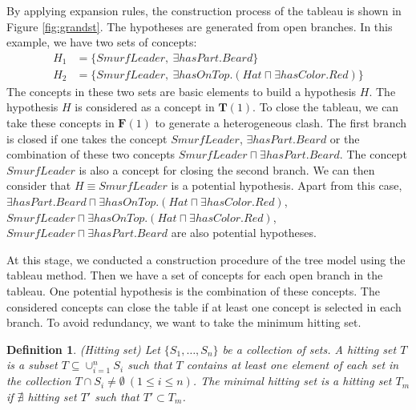 \documentclass{article}
\newtheorem{mydef}{Definition}
\begin{document}
By applying expansion rules, the construction process of the tableau is shown in Figure \ref{fig:grandst}. The hypotheses are generated from open branches.
In this example, we have two sets of concepts:
\begin{align*}
H_1&=\{SmurfLeader,~\exists hasPart.Beard\}\\
H_2&=\{SmurfLeader,~\exists hasOnTop.(Hat \sqcap  \exists hasColor.Red)\}
\end{align*}
The concepts in these two sets are basic elements to build a hypothesis $H$. The hypothesis $H$ is considered as a concept in $\mathbf{T}(1)$.
To close the tableau, we can take these concepts in $\mathbf{F}(1)$ to generate a heterogeneous clash.
The first branch is closed if one takes the concept $SmurfLeader$, $\exists hasPart.Beard$ or the combination of these two concepts
$SmurfLeader \sqcap \exists hasPart.Beard$. The concept $SmurfLeader$ is also a concept for closing the second branch. We can then consider that $H\equiv SmurfLeader$
is a potential hypothesis. Apart from this case, $\exists hasPart. Beard \sqcap \exists hasOnTop.(Hat \sqcap \exists hasColor.Red)$,
$SmurfLeader \sqcap \exists hasOnTop.(Hat \sqcap \exists hasColor.Red)$, $SmurfLeader \sqcap \exists hasPart.Beard$ are also potential hypotheses.

At this stage, we conducted a construction procedure of the tree model using  the tableau method. Then we have a set of concepts for each open branch in the tableau.
One potential hypothesis is the combination of these concepts. The considered concepts can close the table if at least one concept is selected in each branch.
To avoid redundancy, we want to take the minimum hitting set. 
\begin{mydef}{(Hitting set)}
 Let $\{ S_1,\dots,S_n\}$ be a collection of sets. A hitting set  $T$ is a subset $T\subseteq \cup_{i=1}^{n} S_i$ such that $T$ contains at least one element
 of each set in the collection $T \cap S_i \neq \emptyset~(1\leq i\leq n)$.
 The minimal hitting set is a hitting set $T_m$ if  $\nexists$ hitting set $T'$ such that $T'\subset T_m$.
\end{mydef}
\end{document}
